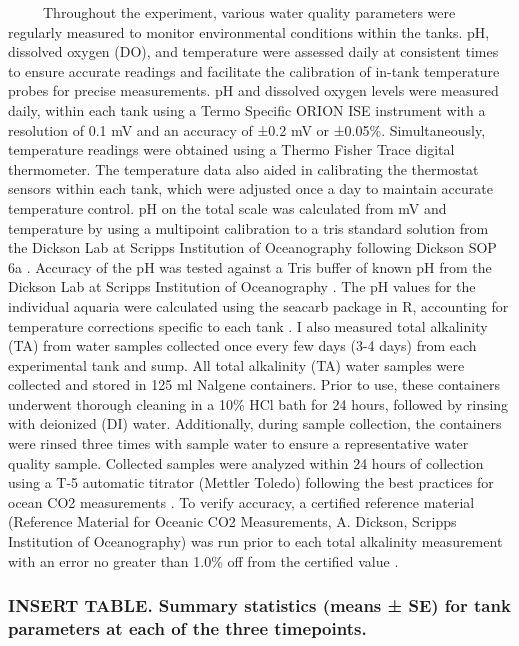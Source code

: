 \documentclass[
  12pt,
]{article}
\begin{document}
~~~~~Throughout the experiment, various water quality parameters were
regularly measured to monitor environmental conditions within the tanks.
pH, dissolved oxygen (DO), and temperature were assessed daily at
consistent times to ensure accurate readings and facilitate the
calibration of in-tank temperature probes for precise measurements. pH
and dissolved oxygen levels were measured daily, within each tank using
a Termo Specific ORION ISE instrument with a resolution of 0.1 mV and an
accuracy of ±0.2 mV or ±0.05\%. Simultaneously, temperature readings
were obtained using a Thermo Fisher Trace digital thermometer. The
temperature data also aided in calibrating the thermostat sensors within
each tank, which were adjusted once a day to maintain accurate
temperature control. pH on the total scale was calculated from mV and
temperature by using a multipoint calibration to a tris standard
solution from the Dickson Lab at Scripps Institution of Oceanography
following Dickson SOP 6a \cite{dickson2007guide}. Accuracy of the pH was
tested against a Tris buffer of known pH from the Dickson Lab at Scripps
Institution of Oceanography \cite{dickson2007guide}. The pH values for
the individual aquaria were calculated using the seacarb package in R,
accounting for temperature corrections specific to each tank
\cite{gattuso2015package}. I also measured total alkalinity (TA) from
water samples collected once every few days (3-4 days) from each
experimental tank and sump. All total alkalinity (TA) water samples were
collected and stored in 125 ml Nalgene containers. Prior to use, these
containers underwent thorough cleaning in a 10\% HCl bath for 24 hours,
followed by rinsing with deionized (DI) water. Additionally, during
sample collection, the containers were rinsed three times with sample
water to ensure a representative water quality sample. Collected samples
were analyzed within 24 hours of collection using a T-5 automatic
titrator (Mettler Toledo) following the best practices for ocean CO2
measurements \cite{dickson2007guide}. To verify accuracy, a certified
reference material (Reference Material for Oceanic CO2 Measurements, A.
Dickson, Scripps Institution of Oceanography) was run prior to each
total alkalinity measurement with an error no greater than 1.0\% off
from the certified value \cite{dickson2007guide}.

\hypertarget{insert-table.-summary-statistics-means-se-for-tank-parameters-at-each-of-the-three-timepoints.}{%
\subsubsection{INSERT TABLE. Summary statistics (means ± SE) for tank
parameters at each of the three
timepoints.}\label{insert-table.-summary-statistics-means-se-for-tank-parameters-at-each-of-the-three-timepoints.}}
\end{document}
